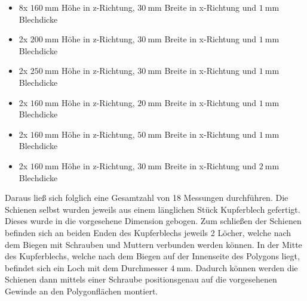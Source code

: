\begin{itemize}
	\item 8x $\SI{160}{\milli\meter}$ H\"ohe in z-Richtung, $\SI{30}{\milli\meter}$ Breite in x-Richtung und $\SI{1}{\milli\meter}$ Blechdicke
	\item 2x $\SI{200}{\milli\meter}$ H\"ohe in z-Richtung, $\SI{30}{\milli\meter}$ Breite in x-Richtung und $\SI{1}{\milli\meter}$ Blechdicke
	\item 2x $\SI{250}{\milli\meter}$ H\"ohe in z-Richtung, $\SI{30}{\milli\meter}$ Breite in x-Richtung und $\SI{1}{\milli\meter}$ Blechdicke
	\item 2x $\SI{160}{\milli\meter}$ H\"ohe in z-Richtung, $\SI{20}{\milli\meter}$ Breite in x-Richtung und $\SI{1}{\milli\meter}$ Blechdicke
	\item 2x $\SI{160}{\milli\meter}$ H\"ohe in z-Richtung, $\SI{50}{\milli\meter}$ Breite in x-Richtung und $\SI{1}{\milli\meter}$ Blechdicke
	\item 2x $\SI{160}{\milli\meter}$ H\"ohe in z-Richtung, $\SI{30}{\milli\meter}$ Breite in x-Richtung und $\SI{2}{\milli\meter}$ Blechdicke
\end{itemize}
Daraus lie\ss{} sich folglich eine Gesamtzahl von 18 Messungen durchf\"uhren. Die Schienen selbst wurden jeweils aus einem l\"anglichen St\"uck Kupferblech gefertigt. Dieses wurde in die vorgesehene Dimension gebogen. Zum schlie\ss{}en der Schienen befinden sich an beiden Enden des Kupferblechs jeweils 2 L\"ocher, welche nach dem Biegen mit Schrauben und Muttern verbunden werden k\"onnen. In der Mitte des Kupferblechs, welche nach dem Biegen auf der Innenseite des Polygons liegt, befindet sich ein Loch mit dem Durchmesser $\SI{4}{\milli\meter}$. Dadurch k\"onnen werden die Schienen dann mittels einer Schraube positionsgenau auf die vorgesehenen Gewinde an den Polygonfl\"achen montiert.